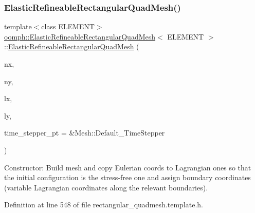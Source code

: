 \subsubsection{\texorpdfstring{Elastic\+Refineable\+Rectangular\+Quad\+Mesh()}{ElasticRefineableRectangularQuadMesh()}\hspace{0.1cm}{\footnotesize\ttfamily [1/3]}}
{\footnotesize\ttfamily template$<$class E\+L\+E\+M\+E\+NT$>$ \\
\hyperlink{classoomph_1_1ElasticRefineableRectangularQuadMesh}{oomph\+::\+Elastic\+Refineable\+Rectangular\+Quad\+Mesh}$<$ E\+L\+E\+M\+E\+NT $>$\+::\hyperlink{classoomph_1_1ElasticRefineableRectangularQuadMesh}{Elastic\+Refineable\+Rectangular\+Quad\+Mesh} (\begin{DoxyParamCaption}\item[{const unsigned \&}]{nx,  }\item[{const unsigned \&}]{ny,  }\item[{const double \&}]{lx,  }\item[{const double \&}]{ly,  }\item[{Time\+Stepper $\ast$}]{time\+\_\+stepper\+\_\+pt = {\ttfamily \&Mesh\+:\+:Default\+\_\+TimeStepper} }\end{DoxyParamCaption})\hspace{0.3cm}{\ttfamily [inline]}}



Constructor\+: Build mesh and copy Eulerian coords to Lagrangian ones so that the initial configuration is the stress-\/free one and assign boundary coordinates (variable Lagrangian coordinates along the relevant boundaries). 



Definition at line 548 of file rectangular\+\_\+quadmesh.\+template.\+h.

\mbox{\label{classoomph_1_1ElasticRefineableRectangularQuadMesh_a8925d6c0eb669afc420564a4610b34bd}} 
